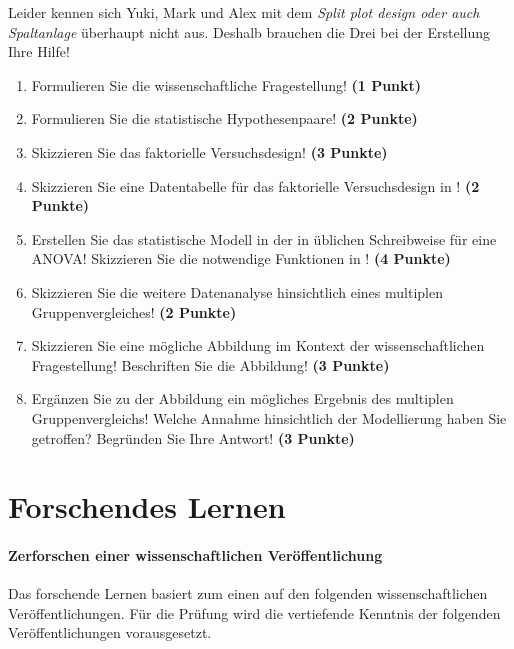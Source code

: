 \documentclass[a4paper, 9pt]{scrartcl}\usepackage[]{graphicx}\usepackage[]{xcolor}
\begin{document}
Leider kennen sich Yuki, Mark und Alex mit dem \textit{Split plot design oder auch Spaltanlage} überhaupt nicht aus. Deshalb brauchen die Drei bei der Erstellung Ihre Hilfe!

\begin{enumerate}
  \setcounter{enumi}{0}
  \item Formulieren Sie die wissenschaftliche Fragestellung! \textbf{(1 Punkt)}
  \item Formulieren Sie die statistische Hypothesenpaare! \textbf{(2 Punkte)}
  \item Skizzieren Sie das faktorielle Versuchsdesign! \textbf{(3 Punkte)}
  \item Skizzieren Sie eine Datentabelle für das faktorielle Versuchsdesign in \Rlogo! \textbf{(2 Punkte)}
  \item Erstellen Sie das statistische Modell in der in \Rlogo üblichen Schreibweise für eine ANOVA! Skizzieren Sie die notwendige Funktionen in \Rlogo! \textbf{(4 Punkte)}
  \item Skizzieren Sie die weitere Datenanalyse hinsichtlich eines multiplen Gruppenvergleiches! \textbf{(2 Punkte)}
  \item Skizzieren Sie eine mögliche Abbildung im Kontext der wissenschaftlichen Fragestellung! Beschriften Sie die Abbildung! \textbf{(3 Punkte)}
  \item Ergänzen Sie zu der Abbildung ein mögliches Ergebnis des multiplen Gruppenvergleichs! Welche Annahme hinsichtlich der Modellierung haben Sie getroffen? Begründen Sie Ihre Antwort! \textbf{(3 Punkte)}
\end{enumerate} 
\clearpage
\part{Forschendes Lernen}

\subsection*{Zerforschen einer wissenschaftlichen Veröffentlichung}

Das forschende Lernen basiert zum einen auf den folgenden wissenschaftlichen Veröffentlichungen. Für die Prüfung wird die vertiefende Kenntnis der folgenden Veröffentlichungen vorausgesetzt.\\
\end{document}
